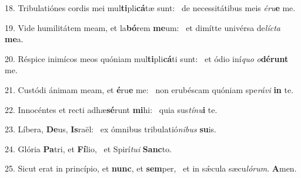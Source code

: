 18. Tribulatiónes cordis mei mul\textbf{ti}pli\textbf{cá}tæ sunt: \ast\  de necessitátibus meis \textit{é}\textit{ru}\textbf{e} me.\

19. Vide humilitátem meam, et la\textbf{bó}rem \textbf{me}um: \ast\  et dimítte univérsa de\textit{líc}\textit{ta} \textbf{me}a.\

20. Réspice inimícos meos quóniam mul\textbf{ti}pli\textbf{cá}ti sunt: \ast\  et ódio iní\textit{quo} \textit{o}\textbf{dé}\textbf{runt} me.\

21. Custódi ánimam meam, et \textbf{é}ru\textbf{e} me: \ast\  non erubéscam quóniam spe\textit{rá}\textit{vi} \textbf{in} te.\

22. Innocéntes et recti adhæ\textbf{sé}runt \textbf{mi}hi: \ast\  quia sus\textit{tí}\textit{nu}\textbf{i} te.\

23. Líbera, \textbf{De}us, \textbf{Is}raël: \ast\  ex ómnibus tribulatió\textit{ni}\textit{bus} \textbf{su}is.\

24. Glória \textbf{Pa}tri, et \textbf{Fí}lio, \ast\  et Spirí\textit{tu}\textit{i} \textbf{Sanc}to.\

25. Sicut erat in princípio, et \textbf{nunc}, et \textbf{sem}per, \ast\  et in sǽcula sæcu\textit{ló}\textit{rum}. \textbf{A}men.\

